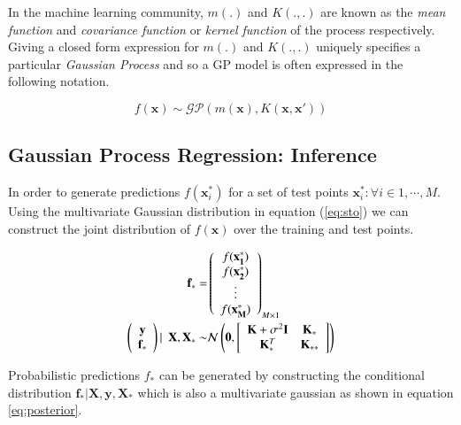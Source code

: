 \documentclass{article}
\begin{document}
In the machine learning community, $m(.)$ and $K(.,.)$ are known as the \emph{mean function} and \emph{covariance function} or \emph{kernel function} of the process respectively. Giving a closed form expression for $m(.)$ and $K(.,.)$ uniquely specifies a particular \emph{Gaussian Process} and so a GP model is often expressed in the following notation.

\begin{equation}
    f(\mathbf{x}) \sim \mathcal{GP}(m(\mathbf{x}), K(\mathbf{x}, \mathbf{x}'))
\end{equation}

\subsection{Gaussian Process Regression: Inference}

In order to generate predictions $f(\mathbf{x}^{*}_i)$ for a set of test points $ {\mathbf{x}^{*}_i : \forall i \in 1, \cdots, M} $. Using the multivariate Gaussian distribution in equation (\ref{eq:sto}) we can construct the joint distribution of $f(\mathbf{x})$ over the training and test points.

\begin{align}
    \mathbf{f}_* = & \left( \begin{array}{c} f(\mathbf{x^{*}_1}) \\ f(\mathbf{x^{*}_2}) \\ \vdots \\ f(\mathbf{x^{*}_M}) \end{array} \right)_{M \times 1} \\
     \vspace{4\baselineskip}
    \left( \begin{array}{c} \mathbf{y} \\ \mathbf{f_*} \end{array} \right) | \ \ \mathbf{X}, \mathbf{X}_* \sim & 
    \mathcal{N}\left(\mathbf{0}, \left[ \begin{array}{cc} \mathbf{K} + \sigma^{2} \mathbf{I} & \mathbf{K}_{*} \\ \mathbf{K}_{*}^T & \mathbf{K}_{**} \end{array} \right ] \right) \label{eq:dist}
\end{align}

Probabilistic predictions $f_*$ can be generated by constructing the conditional distribution $\mathbf{f_*}|\mathbf{X},\mathbf{y},\mathbf{X_*}$ which is also a multivariate gaussian as shown in equation \ref{eq:posterior}.
\end{document}
